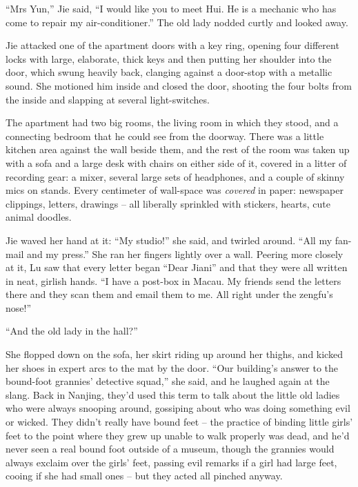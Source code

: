 ``Mrs Yun,'' Jie said, ``I would like you to meet Hui. He is a
mechanic who has come to repair my air-conditioner.'' The old lady
nodded curtly and looked away.

Jie attacked one of the apartment doors with a key ring, opening
four different locks with large, elaborate, thick keys and then
putting her shoulder into the door, which swung heavily back,
clanging against a door-stop with a metallic sound. She motioned
him inside and closed the door, shooting the four bolts from the
inside and slapping at several light-switches.

The apartment had two big rooms, the living room in which they
stood, and a connecting bedroom that he could see from the doorway.
There was a little kitchen area against the wall beside them, and
the rest of the room was taken up with a sofa and a large desk with
chairs on either side of it, covered in a litter of recording gear:
a mixer, several large sets of headphones, and a couple of skinny
mics on stands. Every centimeter of wall-space was \emph{covered}
in paper: newspaper clippings, letters, drawings -- all liberally
sprinkled with stickers, hearts, cute animal doodles.

Jie waved her hand at it: ``My studio!'' she said, and twirled
around. ``All my fan-mail and my press.'' She ran her fingers lightly
over a wall. Peering more closely at it, Lu saw that every letter
began ``Dear Jiani'' and that they were all written in neat, girlish
hands. ``I have a post-box in Macau. My friends send the letters
there and they scan them and email them to me. All right under the
zengfu's nose!''

``And the old lady in the hall?''

She flopped down on the sofa, her skirt riding up around her
thighs, and kicked her shoes in expert arcs to the mat by the door.
``Our building's answer to the bound-foot grannies' detective
squad,'' she said, and he laughed again at the slang. Back in
Nanjing, they'd used this term to talk about the little old ladies
who were always snooping around, gossiping about who was doing
something evil or wicked. They didn't really have bound feet -- the
practice of binding little girls' feet to the point where they grew
up unable to walk properly was dead, and he'd never seen a real
bound foot outside of a museum, though the grannies would always
exclaim over the girls' feet, passing evil remarks if a girl had
large feet, cooing if she had small ones -- but they acted all
pinched anyway.


